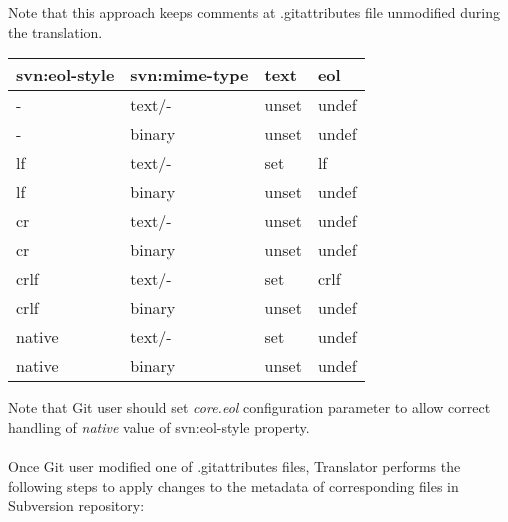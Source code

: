 Note that this approach keeps comments at .gitattributes file unmodified during the translation.

\begin{center}
\begin{tabular}{ | l | l | l | l |}
	\hline
	svn:eol-style &   svn:mime-type &   text  & eol \\ \hline \hline
	-             &   text/-        &   unset & undef \footnotemark[1] \footnotemark[2] \\ \hline
	-             &   binary        &   unset & undef \\ \hline
	lf            &   text/-        &   set   & lf \\ \hline
	lf            &   binary        &   unset & undef \\ \hline
	cr            &   text/-        &   unset & undef  \footnotemark[3] \\ \hline
	cr            &   binary        &   unset & undef \\ \hline
	crlf          &   text/-        &   set   & crlf \\ \hline
	crlf          &   binary        &   unset & undef \\ \hline
	native        &   text/-        &   set   & undef \footnotemark[4] \\ \hline
	native        &   binary        &   unset & undef \\ \hline
\end{tabular}
\label{eol_mime_svn_to_git}
\end{center}

Note that Git user should set \emph{core.eol} configuration parameter to allow correct handling of \emph{native} value of svn:eol-style property.
\\\\
Once Git user modified one of .gitattributes files, Translator performs the following steps to apply changes to the metadata of corresponding files in Subversion repository:

